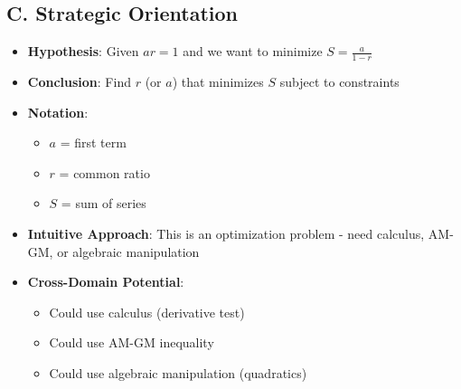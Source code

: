 \documentclass[12pt]{article}
\begin{document}
\begin{problemconfigbox}
\subsection*{C. Strategic Orientation}
\begin{itemize}[leftmargin=*]
    \item \textbf{Hypothesis}: Given $ar = 1$ and we want to minimize $S = \frac{a}{1-r}$
    \item \textbf{Conclusion}: Find $r$ (or $a$) that minimizes $S$ subject to constraints
    \item \textbf{Notation}: 
    \begin{itemize}
        \item $a$ = first term
        \item $r$ = common ratio
        \item $S$ = sum of series
    \end{itemize}
    \item \textbf{Intuitive Approach}: This is an optimization problem - need calculus, AM-GM, or algebraic manipulation
    \item \textbf{Cross-Domain Potential}: 
    \begin{itemize}
        \item Could use calculus (derivative test)
        \item Could use AM-GM inequality
        \item Could use algebraic manipulation (quadratics)
    \end{itemize}
\end{itemize}
\end{problemconfigbox}
\end{document}
